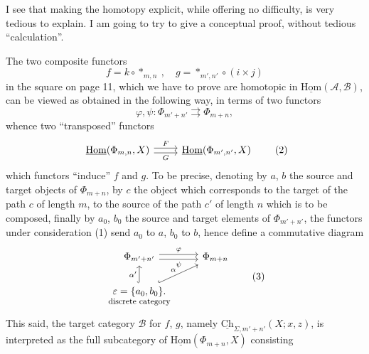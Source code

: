\documentclass[11pt]{article}
\newcommand{\printedpage}[1]{\marginpar{\footnotesize p.~#1}}
\newcommand{\msp}[1]{\marginpar{\footnotesize [#1]}}
\newcommand{\Ch}{\underline{\mathrm{Ch}}}
\newcommand{\uHom}{\underline{\mathrm{Hom}}}
\begin{document}
I see that making the homotopy explicit, while offering no difficulty, is very tedious to explain. I am going to try to give a conceptual proof, without tedious ``calculation''.


\printedpage{10}

\msp{page 15}
The two composite functors
\[
f=k\circ *_{m,n}\ ,\quad g=*_{m',n'}\circ(i\times j)
\]
in the square on page 11, which we have to prove are homotopic in $\uHom(\mathcal{A},\mathcal{B})$, can be viewed as obtained in the following way, in terms of two functors
\[
\varphi,\psi:\Phi_{m'+n'}\rightrightarrows\Phi_{m+n}, \tag*{(1)}
\]
whence two ``transposed'' functors
\[
\begin{tikzcd}
\uHom(\Phi_{m,n},X) \arrow[r,shift left,"F"] \arrow[r,shift right,"G"'] & \uHom(\Phi_{m',n'},X)
\end{tikzcd} \tag*{(2)}
\]
 which functors ``induce'' $f$ and $g$. To be precise, denoting by $a$, $b$ the source and target objects of $\Phi_{m+n}$, by $c$ the object which corresponds to the target of the path $c$ of length $m$, to the source of the path $c'$ of length $n$ which is to be composed, finally by $a_0$, $b_0$ the source and target elements of $\Phi_{m'+n'}$, the functors under consideration (1) send $a_0$ to $a$, $b_0$ to $b$, hence define a commutative diagram
\[
\begin{tikzcd}
\Phi_{m'+n'} \arrow[r,shift left,"\varphi"] \arrow[r,shift right,"\psi"'] & \Phi_{m+n} \\
\underset{\text{\footnotesize discrete category}}{\varepsilon=\{a_0,b_0\}.} \arrow[u,hook,"\alpha'"] \arrow[ur,hook,"\alpha"] &
\end{tikzcd} \tag*{(3)}
\]
This said, the target category $\mathcal{B}$ for $f$, $g$, namely $\Ch_{\Sigma,m'+n'}(X;x,z)$, is interpreted as the full subcategory of $\uHom(\Phi_{m+n},X)$ consisting
\end{document}

